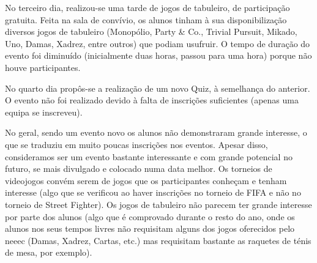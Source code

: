 No terceiro dia, realizou-se uma tarde de jogos de tabuleiro, de participação gratuita. Feita na sala de convívio, os alunos tinham à sua disponibilização diversos jogos de tabuleiro (Monopólio, Party \& Co., Trivial Pursuit, Mikado, Uno, Damas, Xadrez, entre outros) que podiam usufruir. O tempo de duração do evento foi diminuído (inicialmente duas horas, passou para uma hora) porque não houve participantes.

No quarto dia propôs-se a realização de um novo Quiz, à semelhança do anterior. O evento não foi realizado devido à falta de inscrições suficientes (apenas uma equipa se inscreveu).

No geral, sendo um evento novo os alunos não demonstraram grande interesse, o que se traduziu em muito poucas inscrições nos eventos. Apesar disso, consideramos ser um evento bastante interessante e com grande potencial no futuro, se mais divulgado e colocado numa data melhor. Os torneios de videojogos convém serem de jogos que os participantes conheçam e tenham interesse (algo que se verificou ao haver inscrições no torneio de FIFA e não no torneio de Street Fighter). Os jogos de tabuleiro não parecem ter grande interesse por parte dos alunos (algo que é comprovado durante o resto do ano, onde os alunos nos seus tempos livres não requisitam alguns dos jogos oferecidos pelo \acrshort{neeec} (Damas, Xadrez, Cartas, etc.) mas requisitam bastante as raquetes de ténis de mesa, por exemplo).
